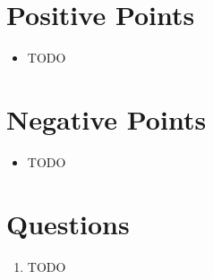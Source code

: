 \documentclass{article}
\begin{document}
\begin{normalsize}
	   	\section{Positive Points}
	   	\begin{itemize}
	   	    \item TODO
	   	\end{itemize}
	   	
	   	\section{Negative Points}
	   	\begin{itemize}
			\item TODO
	   	\end{itemize}
	   	
	   	\section{Questions}
	   	\begin{enumerate}
	   	    \item TODO
	   	\end{enumerate}

    \end{normalsize}
    
    
    
  
\end{document}

